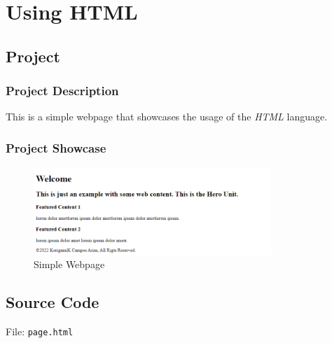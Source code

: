 \section{Using HTML}\label{sec:html}

\subsection{Project}

\subsubsection*{Project Description}
This is a simple webpage that showcases the usage of the \textit{HTML} language.

\subsubsection*{Project Showcase}
\begin{figure}[H]
    \centering
    \includegraphics[width=0.8\textwidth]{res/html.png}
    \caption{Simple Webpage}
    \label{fig:html}
\end{figure}

\subsection{Source Code}

File: \texttt{page.html}
